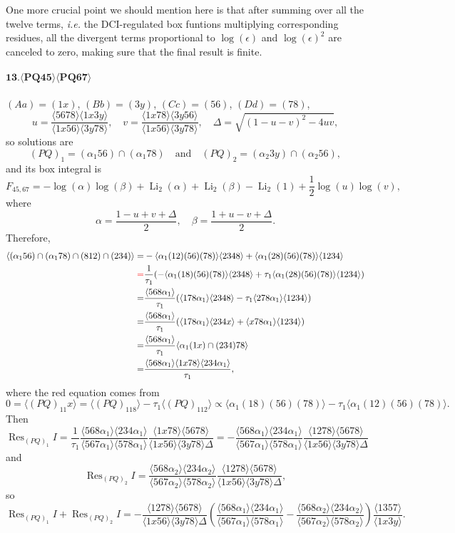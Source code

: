\documentclass[10pt]{article}
\def\<{\langle}
\def\>{\rangle}
\def\Res{\operatorname{Res}}
\begin{document}
One more crucial point we should mention here is that after summing over all the twelve terms, {\it i.e.} the DCI-regulated box funtions multiplying corresponding residues, all the divergent terms proportional to $\log(\epsilon)$ and $\log(\epsilon)^2$ are canceled to zero, making sure that the final result is finite. 

\paragraph{$\mathbf{13.\<PQ45\>\<PQ67\>}$}

$(Aa)=(1x)$, $(Bb)=(3y)$, $(Cc)=(56)$, $(Dd)=(78)$, 
\[
    u=\frac{\<5678\> \<1x3y\>}{\<1x56\> \<3y78\>},\quad v=\frac{\<1x78\> \<3y56\>}{\<1x56\> \<3y78\>},\quad 
    \Delta=\sqrt{(1-u-v)^2-4 u v},
\]
so solutions are
\[
    (PQ)_1=(\alpha_1 56)\cap(\alpha_1 78) \quad\text{and}\quad (PQ)_2=(\alpha_2 3y)\cap (\alpha_2 56),
\]
and its box integral is 
\[
   F_{45,67}=-\log (\alpha) \log (\beta)+\operatorname{Li}_2(\alpha)+\operatorname{Li}_2(\beta)-\operatorname{Li}_2(1)+\frac{1}{2} \log (u) \log (v),
\]
where 
\[
    \alpha=\frac{1 - u + v+\Delta}{2},\quad \beta=\frac{1 + u - v+\Delta}{2}.
\]
Therefore,
\begin{align*}
    \langle (\alpha_156)\cap(\alpha_1 78)\cap(812)\cap(234)\rangle =&-\langle \alpha_1(12)(56)(78)\rangle\<2348\>+\langle \alpha_1(28)(56)(78)\rangle\<1234\>\\
    {\color{red}=}&\frac{1}{\tau_1}(-\langle \alpha_1(18)(56)(78)\rangle\<2348\>+\tau_1\langle \alpha_1(28)(56)(78)\rangle\<1234\>)\\
    =&\frac{\<568\alpha_1\>}{\tau_1}(\<178\alpha_1\>\<2348\>-\tau_1\<278\alpha_1\>\<1234\>)\\
    =&\frac{\<568\alpha_1\>}{\tau_1}(\<178\alpha_1\>\<234x\>+\<x78\alpha_1\>\<1234\>)\\
    =&\frac{\<568\alpha_1\>}{\tau_1}\langle \alpha_1 (1x)\cap (234) 78\rangle\\
    =&\frac{\<568\alpha_1\>\<1x78\>\<234\alpha_1\>}{\tau_1},
\end{align*}
where the red equation comes from
\[
    0=\langle (PQ)_11x\rangle = \langle (PQ)_118\rangle - \tau_1\langle (PQ)_112\rangle\propto
    \langle \alpha_1 (18)(56)(78)\rangle - \tau_1\langle \alpha_1 (12)(56)(78)\rangle.
\]
Then
\[
    \Res_{(PQ)_1}I=\frac{1}{\tau_1}\frac{\<568\alpha_1\>\<234\alpha_1\>}{\<567\alpha_1\>\<578\alpha_1\>}\frac{\<1x78\>\<5678\>}{\<1x56\>\<3y78\>\Delta }=-\frac{\<568\alpha_1\>\<234\alpha_1\>}{\<567\alpha_1\>\<578\alpha_1\>}\frac{\<1278\>\<5678\>}{\<1x56\>\<3y78\>\Delta }
\]
and 
\[
    \Res_{(PQ)_2}I=\frac{\<568\alpha_2\>\<234\alpha_2\>}{\<567\alpha_2\>\<578\alpha_2\>}\frac{\<1278\>\<5678\>}{\<1x56\>\<3y78\>\Delta },
\]
so 
\[
    \Res_{(PQ)_1}I+\Res_{(PQ)_2}I = -\frac{\<1278\>\<5678\>}{\<1x56\>\<3y78\>\Delta }\left(\frac{\<568\alpha_1\>\<234\alpha_1\>}{\<567\alpha_1\>\<578\alpha_1\>}-\frac{\<568\alpha_2\>\<234\alpha_2\>}{\<567\alpha_2\>\<578\alpha_2\>}\right)\frac{\<1357\>}{\<1x3y\>}.
\]
\end{document}
